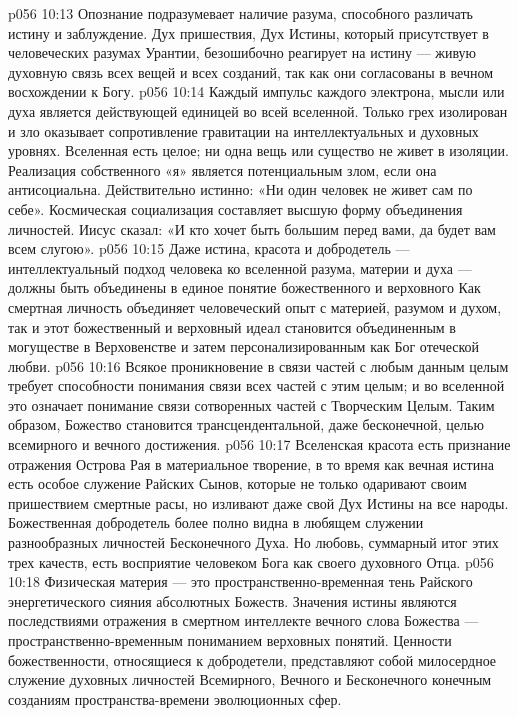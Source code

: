 \vs p056 10:13 \pc Опознание  подразумевает наличие разума, способного различать истину и заблуждение. Дух пришествия, Дух Истины, который присутствует в человеческих разумах Урантии, безошибочно реагирует на истину --- живую духовную связь всех вещей и всех созданий, так как они согласованы в вечном восхождении к Богу.
\vs p056 10:14 Каждый импульс каждого электрона, мысли или духа является действующей единицей во всей вселенной. Только грех изолирован и зло оказывает сопротивление гравитации на интеллектуальных и духовных уровнях. Вселенная есть целое; ни одна вещь или существо не живет в изоляции. Реализация собственного «я» является потенциальным злом, если она антисоциальна. Действительно истинно: «Ни один человек не живет сам по себе». Космическая социализация составляет высшую форму объединения личностей. Иисус сказал: «И кто хочет быть большим перед вами, да будет вам всем слугою».
\vs p056 10:15 Даже истина, красота и добродетель --- интеллектуальный подход человека ко вселенной разума, материи и духа --- должны быть объединены в единое понятие божественного и верховного  Как смертная личность объединяет человеческий опыт с материей, разумом и духом, так и этот божественный и верховный идеал становится объединенным в могуществе в Верховенстве и затем персонализированным как Бог отеческой любви.
\vs p056 10:16 Всякое проникновение в связи частей с любым данным целым требует способности понимания связи всех частей с этим целым; и во вселенной это означает понимание связи сотворенных частей с Творческим Целым. Таким образом, Божество становится трансцендентальной, даже бесконечной, целью всемирного и вечного достижения.
\vs p056 10:17 \pc Вселенская красота есть признание отражения Острова Рая в материальное творение, в то время как вечная истина есть особое служение Райских Сынов, которые не только одаривают своим пришествием смертные расы, но изливают даже свой Дух Истины на все народы. Божественная добродетель более полно видна в любящем служении разнообразных личностей Бесконечного Духа. Но любовь, суммарный итог этих трех качеств, есть восприятие человеком Бога как своего духовного Отца.
\vs p056 10:18 Физическая материя --- это пространственно\hyp{}временная тень Райского энергетического сияния абсолютных Божеств. Значения истины являются последствиями отражения в смертном интеллекте вечного слова Божества --- пространственно\hyp{}временным пониманием верховных понятий. Ценности божественности, относящиеся к добродетели, представляют собой милосердное служение духовных личностей Всемирного, Вечного и Бесконечного конечным созданиям пространства\hyp{}времени эволюционных сфер.
